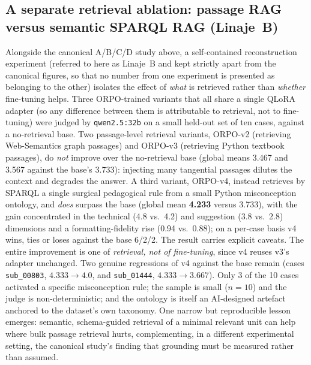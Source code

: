 \documentclass[sageh]{sagej}
\begin{document}
\subsection{A separate retrieval ablation: passage RAG versus semantic SPARQL RAG (Linaje~B)}
Alongside the canonical A/B/C/D study above, a self-contained reconstruction experiment (referred to here as Linaje~B and kept strictly apart from the canonical figures, so that no number from one experiment is presented as belonging to the other) isolates the effect of \emph{what} is retrieved rather than \emph{whether} fine-tuning helps. Three ORPO-trained variants that all share a single QLoRA adapter (so any difference between them is attributable to retrieval, not to fine-tuning) were judged by \texttt{qwen2.5:32b} on a small held-out set of ten cases, against a no-retrieval base. Two passage-level retrieval variants, ORPO-v2 (retrieving Web-Semantics graph passages) and ORPO-v3 (retrieving Python textbook passages), do \emph{not} improve over the no-retrieval base (global means 3.467 and 3.567 against the base's 3.733): injecting many tangential passages dilutes the context and degrades the answer. A third variant, ORPO-v4, instead retrieves by SPARQL a single surgical pedagogical rule from a small Python misconception ontology, and \emph{does} surpass the base (global mean \textbf{4.233} versus 3.733), with the gain concentrated in the technical (4.8 vs.\ 4.2) and suggestion (3.8 vs.\ 2.8) dimensions and a formatting-fidelity rise (0.94 vs.\ 0.88); on a per-case basis v4 wins, ties or loses against the base 6/2/2. The result carries explicit caveats. The entire improvement is one of \emph{retrieval, not of fine-tuning}, since v4 reuses v3's adapter unchanged. Two genuine regressions of v4 against the base remain (cases \texttt{sub\_00803}, $4.333\rightarrow4.0$, and \texttt{sub\_01444}, $4.333\rightarrow3.667$). Only 3 of the 10 cases activated a specific misconception rule; the sample is small ($n=10$) and the judge is non-deterministic; and the ontology is itself an AI-designed artefact anchored to the dataset's own taxonomy. One narrow but reproducible lesson emerges: semantic, schema-guided retrieval of a minimal relevant unit can help where bulk passage retrieval hurts, complementing, in a different experimental setting, the canonical study's finding that grounding must be measured rather than assumed.

\end{document}
